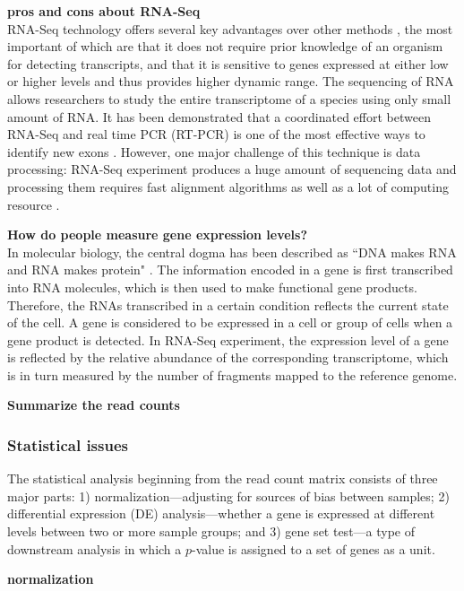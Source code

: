 	 \textbf{pros and cons about RNA-Seq}\\
	 RNA-Seq technology offers several key advantages over other methods \citep{wang2009rna}, the most important of which are that it does not require prior knowledge of an organism for detecting transcripts,  and that it is sensitive to genes expressed at either low or higher levels and thus provides higher dynamic range. The sequencing of RNA allows researchers to study the entire transcriptome of a species using only small amount of RNA. It has been demonstrated that a coordinated effort between RNA-Seq and real time PCR (RT-PCR) is one of the most effective ways to identify new exons \citep{howald2012combining}. However, one major challenge of this technique is data processing: RNA-Seq experiment produces a huge amount of sequencing data and processing them requires fast alignment algorithms as well as a lot of computing resource \citep{langmead2009ultrafast,li2010fast}.
	
	
	\textbf{How do people measure gene expression levels?}\\
		In molecular biology, the central dogma has been described as ``DNA makes RNA and RNA makes protein" \citep{leavitt2004deciphering}. The information encoded in a gene is first transcribed into RNA molecules, which is then used to make functional gene products. Therefore, the RNAs transcribed in a certain condition reflects the current state of the cell. A gene is considered to be expressed in a cell or group of cells when a gene product is detected. In RNA-Seq experiment, the expression level of a gene is reflected by the relative abundance of the corresponding transcriptome, which is in turn measured by the number of fragments  mapped to the reference genome. 
		
	\textbf{Summarize the read counts}

	\subsubsection{Statistical issues}
	The statistical analysis beginning from the read count matrix consists of three major parts: 1) normalization---adjusting for sources of bias between samples; 2) differential expression (DE) analysis---whether a gene is expressed at different levels between two or more sample groups; and 3) gene set test---a type of downstream analysis in which a $p$-value is assigned to a set of genes as a unit.
	
	\textbf{normalization}\\
	
